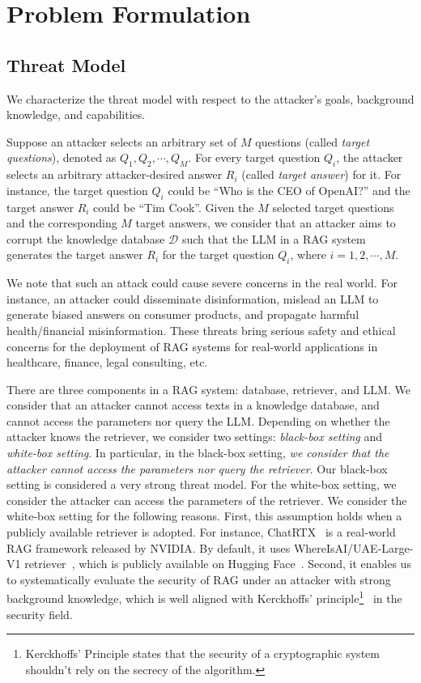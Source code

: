 \section{Problem Formulation}
\subsection{Threat Model}
We characterize the threat model with respect to the attacker's goals, background knowledge, and capabilities.


 Suppose an attacker selects an arbitrary set of $M$ questions (called \emph{target questions}), denoted as $Q_1, Q_2, \cdots, Q_M$. 
For every target question $Q_i$, the attacker selects an arbitrary attacker-desired answer $R_i$ (called \emph{target answer}) for it.  
For instance, the target question $Q_i$ could be ``Who is the CEO of OpenAI?'' and the target answer $R_i$ could be ``Tim Cook''.
Given the $M$ selected target questions and the corresponding $M$ target answers, we consider that an attacker aims to corrupt the knowledge database $\mathcal{D}$ such that the LLM in a RAG system generates the target answer $R_i$ for the target question $Q_i$, where $i=1,2,\cdots, M$. 


We note that such an attack could cause severe concerns in the real world. For instance, an attacker could disseminate disinformation, mislead an LLM to generate biased answers on consumer products, and propagate harmful health/financial misinformation. These threats bring serious safety and ethical concerns for the deployment of RAG systems for real-world applications in healthcare, finance, legal consulting, etc.

There are three components in a RAG system: database, retriever, and LLM. We consider that an attacker cannot access texts in a knowledge database, and cannot access the parameters nor query the LLM. Depending on whether the attacker knows the retriever, we consider two settings: \emph{black-box setting} and \emph{white-box setting}. In particular, in the black-box setting, \emph{we consider that the attacker cannot access the parameters nor query the retriever}. Our black-box setting is considered a very strong threat model.
For the white-box setting, we consider the attacker can access the parameters of the retriever. We consider the white-box setting for the following reasons. First, this assumption holds when a publicly available retriever is adopted. For instance, ChatRTX~\cite{chat-with-rtx} is a real-world RAG framework released by NVIDIA. By default, it uses WhereIsAI/UAE-Large-V1 retriever~\cite{li2023angle}, which is publicly available on Hugging Face~\cite{chat-with-rtx-retriever}. Second, it enables us to systematically evaluate the security of RAG under an attacker with strong background knowledge, which is well aligned with Kerckhoffs’ principle\footnote{Kerckhoffs' Principle states that the security of a cryptographic system shouldn't rely on the secrecy of the algorithm.}~\cite{kerckhoffs1883cryptographie} in the security field.


